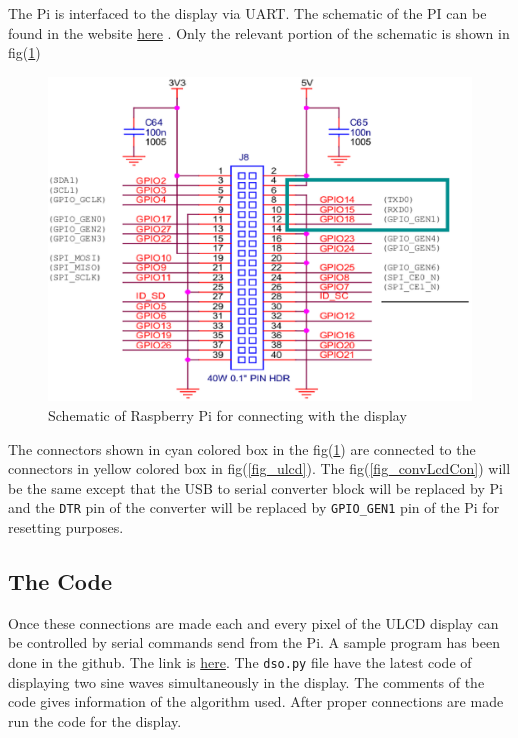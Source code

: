 \documentclass[12pt, a4paper, twoside]{article}
\begin{document}
	The Pi is interfaced to the display via UART. The schematic of the PI can be found in the website \href{https://www.raspberrypi.org/documentation/hardware/raspberrypi/schematics/Raspberry-Pi-2B-V1.2-Schematics.pdf}{here} \cite{bib_pisch}. Only the relevant portion of the schematic is shown in fig(\ref{fig_pisch})

\begin{figure}
	\centering
	\includegraphics[scale=0.65]{./fig/rpisch.eps}
	\caption{Schematic of Raspberry Pi for connecting with the display}
	\label{fig_pisch}
\end{figure}
	
The connectors shown in cyan colored box in the fig(\ref{fig_pisch}) are connected to the connectors in yellow colored box in fig(\ref{fig_ulcd}). The fig(\ref{fig_convLcdCon}) will be the same except that the USB to serial converter block will be replaced by Pi and the \texttt{DTR} pin of the converter will be replaced by \texttt{GPIO\_GEN1} pin of the Pi for resetting purposes.

\subsection{The Code}
	Once these connections are made each and every pixel of the ULCD display can be controlled by serial commands send from the Pi. A sample program has been done in the github. The link is \href{https://github.com/jinujayachandran/dso}{here}\cite{bib_code}. The \texttt{dso.py} file have the latest code of displaying two sine waves simultaneously in the display. The comments of the code gives information of the algorithm used. After proper connections are made run the code for the display.
\end{document}
